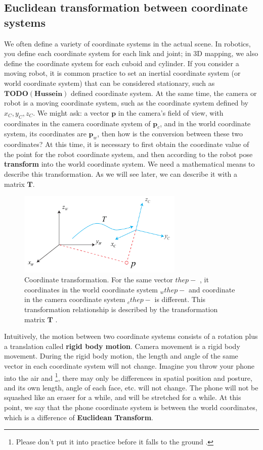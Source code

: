 \subsection{Euclidean transformation between coordinate systems}
We often define a variety of coordinate systems in the actual scene. In robotics, you define each coordinate system for each link and joint; in 3D mapping, we also define the coordinate system for each cuboid and cylinder. If you consider a moving robot, it is common practice to set an inertial coordinate system (or world coordinate system) that can be considered stationary, such as 
$ \bm{TODO(Hussein)} $ defined coordinate system. At the same time, the camera or robot is a moving coordinate system, such as the coordinate system defined by $x_C, y_C, z_C$. We might ask: a vector $\bm{p}$ in the camera's field of view, with coordinates in the camera coordinate system of $\bm{p}_c$, and in the world coordinate system, its coordinates are $ \bm{p}_w$, then how is the conversion between these two coordinates? At this time, it is necessary to first obtain the coordinate value of the point for the robot coordinate system, and then according to the robot pose \textbf{transform} into the world coordinate system. We need a mathematical means to describe this transformation. As we will see later, we can describe it with a matrix $\bm{T}$.

\begin{figure}[!htp]
	\centering
  	\includegraphics[width=0.7\textwidth]{chapter03/rigidMotion/axisTransform.pdf}
	\caption {Coordinate transformation. For the same vector $ \bm{} the p- $ , it coordinates in the world coordinate system $ \bm{} _w the p- $ and coordinate in the camera coordinate system $ \bm{} _c the p- $ is different. This transformation relationship is described by the transformation matrix $ \bm{T} $ . }
	\label{fig:axisTransform}
\end{figure}

Intuitively, the motion between two coordinate systems consists of a rotation plus a translation called \textbf {rigid body motion}. Camera movement is a rigid body movement. During the rigid body motion, the length and angle of the same vector in each coordinate system will not change. Imagine you throw your phone into the air and \footnote {Please don't put it into practice before it falls to the ground . }, there may only be differences in spatial position and posture, and its own length, angle of each face, etc. will not change. The phone will not be squashed like an eraser for a while, and will be stretched for a while. At this point, we say that the phone coordinate system is between the world coordinates, which is a difference of \textbf {Euclidean Transform}.

